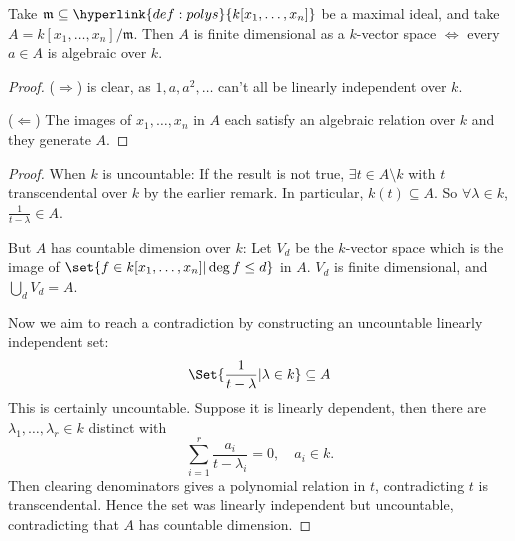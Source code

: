 \documentclass{article}
\begin{document}
\begin{remark}
    Take $\mathfrak{m} \subseteq \hyperlink{def:polys}{k[x_1, \dotsc, x_n]}$ be a maximal ideal, and take $A=k[x_1, \dotsc, x_n]/\mathfrak{m}$.
    Then $A$ is finite dimensional as a $k$-vector space $\iff$ every $a \in A$ is algebraic over $k$.
\end{remark}
\begin{proof}
    ($\Rightarrow$) is clear, as $1, a, a^2, \dotsc$ can't all be linearly independent over $k$.

    ($\Leftarrow$) The images of $x_1, \dotsc, x_n$ in $A$ each satisfy an algebraic relation over $k$ and they generate $A$.
\end{proof}

\begin{proof}
    When $k$ is uncountable: If the result is not true, $\exists t \in A\setminus k$ with $t$ transcendental over $k$ by the earlier remark.
    In particular, $k(t) \subseteq A$.
    So $\forall \lambda \in k$, $\frac{1}{t-\lambda} \in A$.

    But $A$ has countable dimension over $k$:
    Let $V_d$ be the $k$-vector space which is the image of $\set{f \in k[x_1, \dotsc, x_n] | \deg f \leq d}$ in $A$.
    $V_d$ is finite dimensional, and $\bigcup_d V_d = A$.

    Now we aim to reach a contradiction by constructing an uncountable linearly independent set:
    \begin{equation*}
        \Set{\frac{1}{t-\lambda} | \lambda \in k} \subseteq A
    \end{equation*}
    This is certainly uncountable.
    Suppose it is linearly dependent, then there are $\lambda_1, \dotsc, \lambda_r \in k$ distinct with
    \begin{equation*}
        \sum_{i=1}^r \frac{a_i}{t-\lambda_i}=0, \quad a_i \in k.
    \end{equation*}
    Then clearing denominators gives a polynomial relation in $t$, contradicting $t$ is transcendental.
    Hence the set was linearly independent but uncountable, contradicting that $A$ has countable dimension.
\end{proof}
\end{document}
